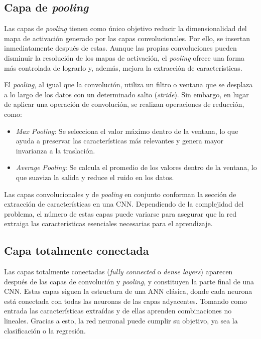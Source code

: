 \subsection{Capa de \textit{pooling}}

Las capas de \textit{pooling} tienen como único objetivo reducir la dimensionalidad del mapa de activación generado por las capas convolucionales. Por ello, se insertan inmediatamente después de estas. Aunque las propias convoluciones pueden disminuir la resolución de los mapas de activación, el \textit{pooling} ofrece una forma más controlada de lograrlo y, además, mejora la extracción de características.

El \textit{pooling}, al igual que la convolución, utiliza un filtro o ventana que se desplaza a lo largo de los datos con un determinado salto (\textit{stride}). Sin embargo, en lugar de aplicar una operación de convolución, se realizan operaciones de reducción, como:
\begin{itemize}
    \item \textit{Max Pooling}: Se selecciona el valor máximo dentro de la ventana, lo que ayuda a preservar las características más relevantes y genera mayor invarianza a la traslación.
    \item \textit{Average Pooling}: Se calcula el promedio de los valores dentro de la ventana, lo que suaviza la salida y reduce el ruido en los datos.
\end{itemize}

Las capas convolucionales y de \textit{pooling} en conjunto conforman la sección de extracción de características en una CNN. Dependiendo de la complejidad del problema, el número de estas capas puede variarse para asegurar que la red extraiga las características esenciales necesarias para el aprendizaje.

\subsection{Capa totalmente conectada}
Las capas totalmente conectadas (\textit{fully connected} o \textit{dense layers}) aparecen después de las capas de convolución y \textit{pooling}, y constituyen la parte final de una CNN. Estas capas siguen la estructura de una ANN clásica, donde cada neurona está conectada con todas las neuronas de las capas adyacentes. Tomando como entrada las características extraídas y de ellas aprenden combinaciones no lineales. Gracias a esto, la red neuronal puede cumplir su objetivo, ya sea la clasificación o la regresión.

